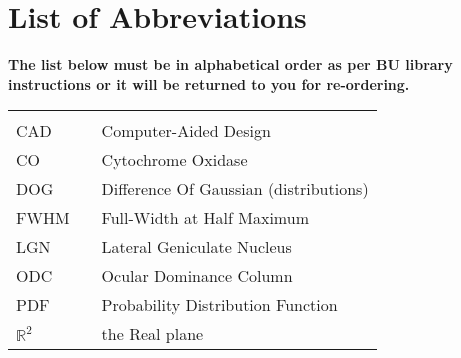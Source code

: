 \begin{abstractpage}

\end{abstractpage}
\cleardoublepage


\tableofcontents
\cleardoublepage

\newpage
\listoftables
\cleardoublepage

\newpage
\listoffigures
\cleardoublepage

\chapter*{List of Abbreviations}

{\bf The list below must be in alphabetical order as per BU library instructions or it will be returned to you for re-ordering.}

\begin{center}
  \begin{tabular}{lll}
    \hspace*{2em} & \hspace*{1in} & \hspace*{4.5in} \\
    CAD  & \dotfill & Computer-Aided Design \\
    CO   & \dotfill & Cytochrome Oxidase \\
    DOG  & \dotfill & Difference Of Gaussian (distributions) \\
    FWHM & \dotfill & Full-Width at Half Maximum \\
    LGN  & \dotfill & Lateral Geniculate Nucleus \\
    ODC  & \dotfill & Ocular Dominance Column \\
    PDF  & \dotfill & Probability Distribution Function \\
    $\mathbb{R}^{2}$  & \dotfill & the Real plane \\
  \end{tabular}
\end{center}
\cleardoublepage


\newpage
\endofprelim
